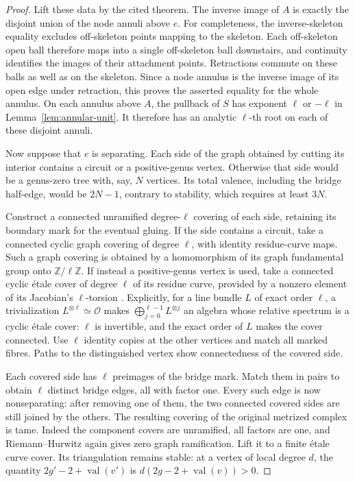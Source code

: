 \begin{proof}
Lift these data by the cited theorem.  The inverse image of $A$ is
exactly the disjoint union of the node annuli above $e$.
For completeness, the inverse-skeleton equality excludes off-skeleton
points mapping to the skeleton.  Each off-skeleton open ball therefore
maps into a single off-skeleton ball downstairs, and continuity
identifies the images of their attachment points.  Retractions commute
on these balls as well as on the skeleton.  Since a node annulus is the
inverse image of its open edge under retraction, this proves the asserted
equality for the whole annulus.  On each annulus above $A$, the
pullback of $S$ has exponent $\ell$ or $-\ell$ in
Lemma~\ref{lem:annular-unit}.  It therefore has an analytic $\ell$-th
root on each of these disjoint annuli.

Now suppose that $e$ is separating.  Each side of the graph obtained by
cutting its interior contains a circuit or a positive-genus vertex.
Otherwise that side would be a genus-zero tree with, say, $N$ vertices.
Its total valence, including the bridge half-edge, would be $2N-1$,
contrary to stability, which requires at least $3N$.

Construct a connected unramified degree-$\ell$ covering of each side,
retaining its boundary mark for the eventual gluing.  If the side
contains a circuit, take a connected cyclic graph covering of degree
$\ell$, with identity residue-curve maps.  Such a graph covering is
obtained by a homomorphism of its graph fundamental group onto
$\mathbb Z/\ell\mathbb Z$.  If instead a positive-genus vertex is used,
take a connected cyclic \'etale cover of degree $\ell$ of its residue
curve, provided by a nonzero element of its Jacobian's $\ell$-torsion
\cite[Theorem~8.2 and Remark~8.4]{MilneAV}.  Explicitly, for a line
bundle $L$ of exact order $\ell$, a trivialization
$L^{\otimes\ell}\simeq\mathcal O$ makes
$\bigoplus_{j=0}^{\ell-1}L^{\otimes j}$ an algebra whose relative
spectrum is a cyclic \'etale cover: $\ell$ is invertible, and the exact
order of $L$ makes the cover connected.  Use $\ell$ identity copies at
the other vertices and match all marked fibres.  Paths to the
distinguished vertex show connectedness of the covered side.

Each covered side has $\ell$ preimages of the bridge mark.  Match them
in pairs to obtain $\ell$ distinct bridge edges, all with factor one.
Every such edge is now nonseparating: after removing one of them, the
two connected covered sides are still joined by the others.
The resulting covering of the original metrized complex is tame.
Indeed the component covers are unramified, all factors are one, and
Riemann--Hurwitz again gives zero graph ramification.  Lift it to a
finite \'etale curve cover.  Its triangulation remains stable: at a
vertex of local degree $d$, the quantity
$2g'-2+\operatorname{val}(v')$ is
$d(2g-2+\operatorname{val}(v))>0$.


\end{proof}
